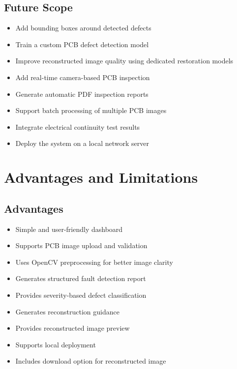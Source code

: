 \documentclass[12pt,a4paper]{report}
\begin{document}
\section{Future Scope}

\begin{itemize}

\item Add bounding boxes around detected defects
\item Train a custom PCB defect detection model
\item Improve reconstructed image quality using dedicated restoration models
\item Add real-time camera-based PCB inspection
\item Generate automatic PDF inspection reports
\item Support batch processing of multiple PCB images
\item Integrate electrical continuity test results
\item Deploy the system on a local network server

\end{itemize}


\chapter{Advantages and Limitations}

\section{Advantages}

\begin{itemize}

\item Simple and user-friendly dashboard
\item Supports PCB image upload and validation
\item Uses OpenCV preprocessing for better image clarity
\item Generates structured fault detection report
\item Provides severity-based defect classification
\item Generates reconstruction guidance
\item Provides reconstructed image preview
\item Supports local deployment
\item Includes download option for reconstructed image

\end{itemize}
\end{document}
